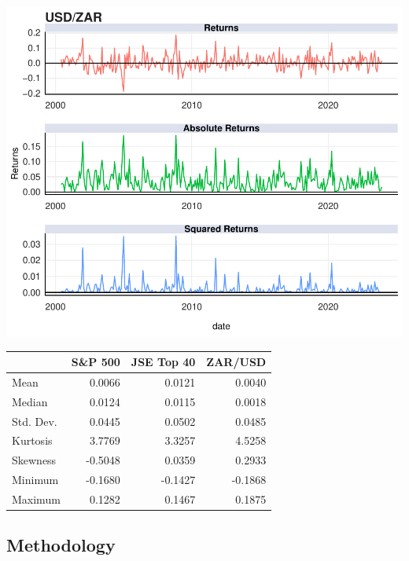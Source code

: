 \documentclass[11pt,preprint, authoryear]{elsarticle}
\let\origfigure\figure
\let\endorigfigure\endfigure
\renewenvironment{figure}[1][2] {
    \expandafter\origfigure\expandafter[H]
} {
    \endorigfigure
}
\let\origtable\table
\let\endorigtable\endtable
\renewenvironment{table}[1][2] {
    \expandafter\origtable\expandafter[H]
} {
    \endorigtable
}
\numberwithin{equation}{section}
\numberwithin{figure}{section}
\numberwithin{table}{section}
\begin{document}
\begin{figure}[H]

{\centering \includegraphics{Template_files/figure-latex/Figure3-1} 

}

\caption{ZAR/USD Returns \label{Figure3}}\label{fig:Figure3}
\end{figure}

\begin{table}[H]
\centering
\caption{Summary Statistics \label{tab1}} 
\begin{tabular}{lrrr}
  \hline
 & S\&P 500 & JSE Top 40 & ZAR/USD \\ 
  \hline
Mean & 0.0066 & 0.0121 & 0.0040 \\ 
  Median & 0.0124 & 0.0115 & 0.0018 \\ 
  Std. Dev. & 0.0445 & 0.0502 & 0.0485 \\ 
  Kurtosis & 3.7769 & 3.3257 & 4.5258 \\ 
  Skewness & -0.5048 & 0.0359 & 0.2933 \\ 
  Minimum & -0.1680 & -0.1427 & -0.1868 \\ 
  Maximum & 0.1282 & 0.1467 & 0.1875 \\ 
   \hline
\end{tabular}
\end{table}

\hypertarget{methodology}{%
\subsection{Methodology}\label{methodology}}
\end{document}
